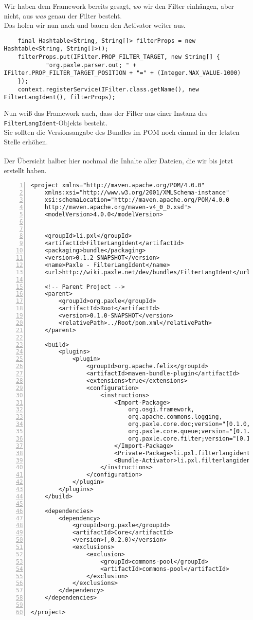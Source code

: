 \documentclass[a4paper,12pt]{scrartcl}
\begin{document}
Wir haben dem Framework bereits gesagt, \emph{wo} wir den Filter einhängen, aber nicht, aus \emph{was} genau der Filter besteht.\\
Das holen wir nun nach und bauen den Activator weiter aus.
\begin{lstlisting}
	final Hashtable<String, String[]> filterProps = new Hashtable<String, String[]>();
	filterProps.put(IFilter.PROP_FILTER_TARGET, new String[] {
			"org.paxle.parser.out; " + IFilter.PROP_FILTER_TARGET_POSITION + "=" + (Integer.MAX_VALUE-1000)
	});
	context.registerService(IFilter.class.getName(), new FilterLangIdent(), filterProps);
\end{lstlisting}
Nun weiß das Framework auch, dass der Filter aus einer Instanz des \lstinline[breaklines=false, basicstyle=\itshape]|FilterLangIdent|-Objekts besteht.\\
Sie sollten die Versionsangabe des Bundles im POM noch einmal in der letzten Stelle erhöhen.\\
\\
Der Übersicht halber hier nochmal die Inhalte aller Dateien, die wir bis jetzt erstellt haben.
\begin{lstlisting}[numbers=left, caption=pom.xml]
<project xmlns="http://maven.apache.org/POM/4.0.0"
	xmlns:xsi="http://www.w3.org/2001/XMLSchema-instance"
	xsi:schemaLocation="http://maven.apache.org/POM/4.0.0
	http://maven.apache.org/maven-v4_0_0.xsd">
	<modelVersion>4.0.0</modelVersion>
	
	
	<groupId>li.pxl</groupId>
	<artifactId>FilterLangIdent</artifactId>
	<packaging>bundle</packaging>
	<version>0.1.2-SNAPSHOT</version>
	<name>Paxle - FilterLangIdent</name>
	<url>http://wiki.paxle.net/dev/bundles/FilterLangIdent</url>
	
	<!-- Parent Project -->
	<parent>
		<groupId>org.paxle</groupId>
		<artifactId>Root</artifactId>
		<version>0.1.0-SNAPSHOT</version>
		<relativePath>../Root/pom.xml</relativePath>
	</parent>
	
	<build>
		<plugins>
			<plugin>
				<groupId>org.apache.felix</groupId>
				<artifactId>maven-bundle-plugin</artifactId>
				<extensions>true</extensions>
				<configuration>
					<instructions>
						<Import-Package>
							org.osgi.framework,
							org.apache.commons.logging,
							org.paxle.core.doc;version="[0.1.0,0.2.0)",
							org.paxle.core.queue;version="[0.1.0,0.2.0)",
							org.paxle.core.filter;version="[0.1.0,0.2.0)"
						</Import-Package>
						<Private-Package>li.pxl.filterlangident.impl</Private-Package>
						<Bundle-Activator>li.pxl.filterlangident.impl.Activator</Bundle-Activator>
					</instructions>
				</configuration>
			</plugin>
		</plugins>
	</build>
	
	<dependencies>
		<dependency>
			<groupId>org.paxle</groupId>
			<artifactId>Core</artifactId>
			<version>[,0.2.0)</version>
			<exclusions>
				<exclusion>
					<groupId>commons-pool</groupId>
					<artifactId>commons-pool</artifactId>
				</exclusion>
			</exclusions>				
		</dependency>
	</dependencies>
	
</project>
\end{lstlisting}
\end{document}
